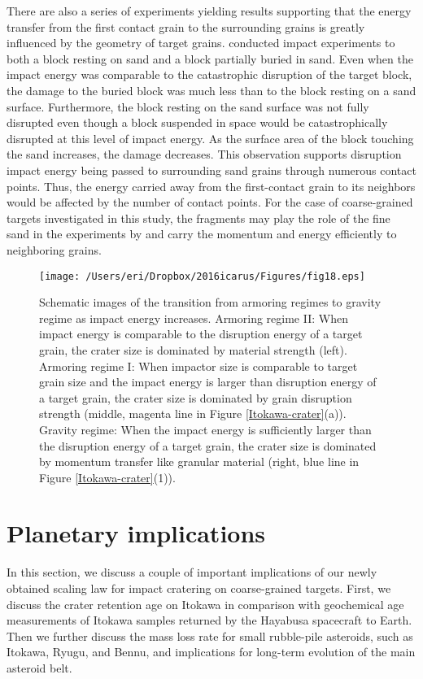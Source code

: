 \documentclass[3p,authoryear]{elsarticle}
\newcommand{\II}{I\hspace{-.1 em}I}
\begin{document}
There are also a series of experiments yielding results supporting that the energy transfer from the first contact grain to the surrounding grains is greatly influenced by the geometry of target grains. \citet{durda2011} conducted impact experiments to both a block resting on sand and a block partially buried in sand. Even when the impact energy was comparable to the catastrophic disruption of the target block, the damage to the buried block was much less than to the block resting on a sand surface. Furthermore, the block resting on the sand surface was not fully disrupted even though a block suspended in space would be catastrophically disrupted at this level of impact energy. As the surface area of the block touching the sand increases, the damage decreases. This observation supports disruption impact energy being passed to surrounding sand grains through numerous contact points. Thus, the energy carried away from the first-contact grain to its neighbors would be affected by the number of contact points. For the case of coarse-grained targets investigated in this study, the fragments may play the role of the fine sand in the experiments by \citet{durda2011} and carry the momentum and energy efficiently to neighboring grains.
\begin{figure}[htbp]
	\centering
	\texttt{[image: /Users/eri/Dropbox/2016icarus/Figures/fig18.eps]}
	\caption{Schematic images of the transition from armoring regimes to gravity regime as impact energy increases. Armoring regime \II: When impact energy is comparable to the disruption energy of a target grain, the crater size is dominated by material strength (left). Armoring regime I: When impactor size is comparable to target grain size and the impact energy is larger than disruption energy of a target grain, the crater size is dominated by grain disruption strength (middle, magenta line in Figure \ref{Itokawa-crater}(a)). Gravity regime: When the impact energy is sufficiently larger than the disruption energy of a target grain, the crater size is dominated by momentum transfer like granular material (right, blue line in Figure \ref{Itokawa-crater}(1)).}
	\label{schema-energy}
	\centering
\end{figure}

\section{Planetary implications}\label{sec:implication}
In this section, we discuss a couple of important implications of our newly obtained scaling law for impact cratering on coarse-grained targets. First, we discuss the crater retention age on Itokawa in comparison with geochemical age measurements of Itokawa samples returned by the Hayabusa spacecraft to Earth. Then we further discuss the mass loss rate for small rubble-pile asteroids, such as Itokawa, Ryugu, and Bennu, and implications for long-term evolution of the main asteroid belt.
\end{document}
